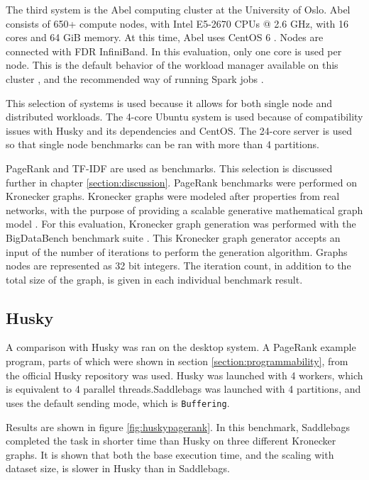 \documentclass{uit-report}
\begin{document}
The third system is the Abel computing cluster at the University of Oslo. Abel consists of 650+ compute nodes, with Intel E5-2670 CPUs @ 2.6 GHz, with 16 cores and 64 GiB memory. At this time, Abel uses CentOS 6 \cite{abel}. Nodes are connected with FDR InfiniBand. In this evaluation, only one core is used per node. This is the default behavior of the workload manager available on this cluster \cite{abeluserguide}, and the recommended way of running Spark jobs \cite{abelspark}. 

This selection of systems is used because it allows for both single node and distributed workloads. The 4-core Ubuntu system is used because of compatibility issues with Husky and its dependencies and CentOS. The 24-core server is used so that single node benchmarks can be ran with more than 4 partitions.

PageRank and TF-IDF are used as benchmarks. This selection is discussed further in chapter \ref{section:discussion}. PageRank benchmarks were performed on Kronecker graphs. Kronecker graphs were modeled after properties from real networks, with the purpose of providing a scalable generative mathematical graph model \cite{leskovec2010kronecker}. For this evaluation, Kronecker graph generation was performed with the BigDataBench benchmark suite \cite{wang2014bigdatabench}. This Kronecker graph generator accepts an input of the number of iterations to perform the generation algorithm. Graphs nodes are represented as 32 bit integers. The iteration count, in addition to the total size of the graph, is given in each individual benchmark result.

\newpage
\subsection{Husky} \label{section:huskycomp}
A comparison with Husky was ran on the desktop system. A PageRank example program, parts of which were shown in section \ref{section:programmability}, from the official Husky repository was used. Husky was launched with 4 workers, which is equivalent to 4 parallel threads.Saddlebags was launched with 4 partitions, and uses the default sending mode, which is \texttt{Buffering}.

Results are shown in figure \ref{fig:huskypagerank}. In this benchmark, Saddlebags completed the task in shorter time than Husky on three different Kronecker graphs. It is shown that both the base execution time, and the scaling with dataset size, is slower in Husky than in Saddlebags.
\end{document}
